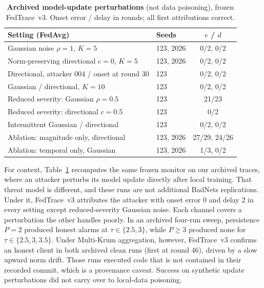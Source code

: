 \documentclass{article}
\newcommand{\vthree}{FedTrace~v3}
\begin{document}
\begin{table}[t]
\centering\footnotesize
\setlength{\tabcolsep}{3pt}
\caption{\textbf{Archived model-update perturbations} (not data poisoning), frozen \vthree. Onset error / delay in
rounds; all first attributions correct.}
\label{tab:archived}
\vspace{-1mm}
\begin{tabular}{@{}llc@{}}
\toprule
Setting (FedAvg) & Seeds & $e$ / $d$ \\
\midrule
Gaussian noise $\rho=1$, $K=5$ & 123, 2026 & 0/2, 0/2 \\
Norm-preserving directional $c=0$, $K=5$ & 123, 2026 & 0/2, 0/2 \\
Directional, attacker 004 / onset at round 30 & 123 & 0/2, 0/2 \\
Gaussian / directional, $K=10$ & 123 & 0/2, 0/2 \\
Reduced severity: Gaussian $\rho=0.5$ & 123 & 21/23 \\
Reduced severity: directional $c=0.5$ & 123 & 0/2 \\
Intermittent Gaussian / directional & 123 & 0/2, 0/2 \\
\midrule
Ablation: magnitude only, directional & 123, 2026 & 27/29, 24/26 \\
Ablation: temporal only, Gaussian & 123, 2026 & 1/3, 0/2 \\
\bottomrule
\end{tabular}
\vspace{-3mm}
\end{table}

For context, Table~\ref{tab:archived} recomputes the same frozen monitor on our archived traces, where an attacker
perturbs its model update directly after local training. That threat model is different, and these runs are not
additional BadNets replications. Under it, \vthree{} attributes the attacker with onset error 0 and delay 2 in
every setting except reduced-severity Gaussian noise. Each channel covers a perturbation the other handles poorly.
In an archived four-run sweep, persistence $P=2$ produced honest alarms at $\tau\in\{2.5,3\}$, while $P\ge3$
produced none for $\tau\in\{2.5,3,3.5\}$. Under Multi-Krum aggregation, however, \vthree{} confirms an honest client
in both archived clean runs (first at round 46), driven by a slow upward norm drift. Those runs executed code that
is not contained in their recorded commit, which is a provenance caveat. Success on synthetic update perturbations
did not carry over to local-data poisoning.
\end{document}
